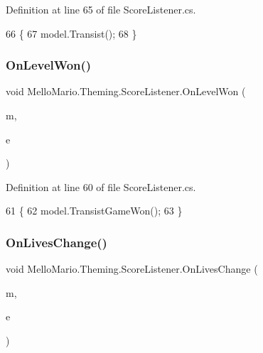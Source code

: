 Definition at line 65 of file Score\+Listener.\+cs.


\begin{DoxyCode}
66         \{
67             model.Transist();
68         \}
\end{DoxyCode}
\mbox{\label{classMelloMario_1_1Theming_1_1ScoreListener_a60fd2649dc800628bcc0d3d65a8f853c}} 
\subsubsection{On\+Level\+Won()}
{\footnotesize\ttfamily void Mello\+Mario.\+Theming.\+Score\+Listener.\+On\+Level\+Won (\begin{DoxyParamCaption}\item[{\textbf{ Flag}}]{m,  }\item[{Event\+Args}]{e }\end{DoxyParamCaption})\hspace{0.3cm}{\ttfamily [private]}}



Definition at line 60 of file Score\+Listener.\+cs.


\begin{DoxyCode}
61         \{
62             model.TransistGameWon();
63         \}
\end{DoxyCode}
\mbox{\label{classMelloMario_1_1Theming_1_1ScoreListener_a120f9d150257a3275dab931c783e2270}} 
\subsubsection{On\+Lives\+Change()}
{\footnotesize\ttfamily void Mello\+Mario.\+Theming.\+Score\+Listener.\+On\+Lives\+Change (\begin{DoxyParamCaption}\item[{\textbf{ Base\+Collidable\+Object}}]{m,  }\item[{\textbf{ Score\+Event\+Args}}]{e }\end{DoxyParamCaption})\hspace{0.3cm}{\ttfamily [private]}}



